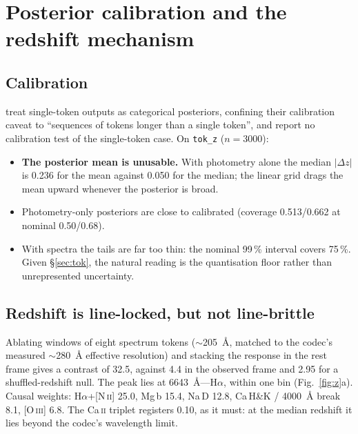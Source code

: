 \documentclass[11pt]{article}
\begin{document}
\section{Posterior calibration and the redshift mechanism}
\label{sec:calib}

\subsection{Calibration}

\citet{parker2025aion} treat single-token outputs as categorical posteriors, confining their
calibration caveat to ``sequences of tokens longer than a single token'', and report no
calibration test of the single-token case. On \texttt{tok\_z} ($n=3000$):
\begin{itemize}\itemsep1pt
\item \textbf{The posterior mean is unusable.} With photometry alone the median $|\Delta z|$ is
0.236 for the mean against 0.050 for the median; the linear grid drags the mean upward whenever
the posterior is broad.
\item Photometry-only posteriors are close to calibrated (coverage 0.513/0.662 at nominal
0.50/0.68).
\item With spectra the tails are far too thin: the nominal 99\,\% interval covers 75\,\%. Given
\S\ref{sec:tok}, the natural reading is the quantisation floor rather than unrepresented
uncertainty.
\end{itemize}

\subsection{Redshift is line-locked, but not line-brittle}

Ablating windows of eight spectrum tokens ($\sim$\SI{205}{\angstrom}, matched to the codec's
measured $\sim$\SI{280}{\angstrom} effective resolution) and stacking the response in the rest
frame gives a contrast of 32.5, against 4.4 in the observed frame and 2.95 for a
shuffled-redshift null. The peak lies at \SI{6643}{\angstrom}---H$\alpha$, within one bin
(Fig.~\ref{fig:z}a). Causal weights: H$\alpha$+[N\,\textsc{ii}] 25.0, Mg\,b 15.4, Na\,D 12.8,
Ca\,H\&K / \SI{4000}{\angstrom} break 8.1, [O\,\textsc{iii}] 6.8. The Ca\,\textsc{ii} triplet
registers 0.10, as it must: at the median redshift it lies beyond the codec's wavelength limit.
\end{document}
